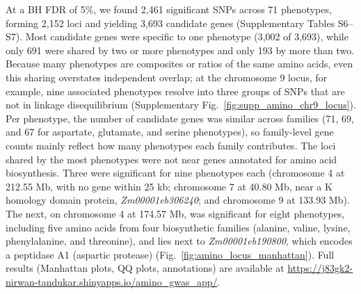 At a BH FDR of 5\%, we found 2,461 significant SNPs across 71 phenotypes, forming 2,152 loci and yielding 3,693 candidate genes (Supplementary Tables S6--S7). Most candidate genes were specific to one phenotype (3,002 of 3,693), while only 691 were shared by two or more phenotypes and only 193 by more than two. Because many phenotypes are composites or ratios of the same amino acids, even this sharing overstates independent overlap; at the chromosome 9 locus, for example, nine associated phenotypes resolve into three groups of SNPs that are not in linkage disequilibrium (Supplementary Fig.~\ref{fig:supp_amino_chr9_locus}). Per phenotype, the number of candidate genes was similar across families (71, 69, and 67 for aspartate, glutamate, and serine phenotypes), so family-level gene counts mainly reflect how many phenotypes each family contributes. The loci shared by the most phenotypes were not near genes annotated for amino acid biosynthesis. Three were significant for nine phenotypes each (chromosome 4 at 212.55 Mb, with no gene within 25 kb; chromosome 7 at 40.80 Mb, near a K homology domain protein, \textit{Zm00001eb306240}; and chromosome 9 at 133.93 Mb). The next, on chromosome 4 at 174.57 Mb, was significant for eight phenotypes, including five amino acids from four biosynthetic families (alanine, valine, lysine, phenylalanine, and threonine), and lies next to \textit{Zm00001eb190800}, which encodes a peptidase A1 (aspartic protease) (Fig.~\ref{fig:amino_locus_manhattan}). Full results (Manhattan plots, QQ plots, annotations) are available at \url{https://j83gk2-nirwan-tandukar.shinyapps.io/amino_gwas_app/}.

